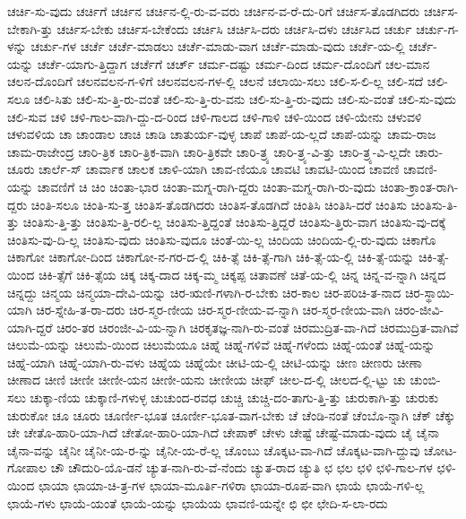 {ಚರ್ಚಿ-ಸು-ವುದು
ಚರ್ಚಿಗೆ
ಚರ್ಚಿನ
ಚರ್ಚಿನ-ಲ್ಲಿ-ರು-ವ-ವರು
ಚರ್ಚಿನ-ವ-ರೆ-ದು-ರಿಗೆ
ಚರ್ಚಿಸ-ತೊಡಗಿದರು
ಚರ್ಚಿಸ-ಬೇಕಾಗಿ-ತ್ತು
ಚರ್ಚಿಸ-ಬೇಕು
ಚರ್ಚಿಸ-ಬೇಕೆಂದು
ಚರ್ಚಿಸಿ
ಚರ್ಚಿಸಿ-ದರು
ಚರ್ಚಿಸಿ-ದಳು
ಚರ್ಚಿಸಿದ
ಚರ್ಚು
ಚರ್ಚು-ಗ-ಳನ್ನು
ಚರ್ಚು-ಗಳ
ಚರ್ಚೆ
ಚರ್ಚೆ-ಮಾಡಲು
ಚರ್ಚೆ-ಮಾಡು-ವಾಗ
ಚರ್ಚೆ-ಮಾಡು-ವುದು
ಚರ್ಚೆ-ಯ-ಲ್ಲಿ
ಚರ್ಚೆ-ಯನ್ನು
ಚರ್ಚೆ-ಯಾಗು-ತ್ತಿದ್ದಾಗ
ಚರ್ಚೆಗೆ
ಚರ್ಚ್
ಚರ್ಮ-ದಷ್ಟು
ಚರ್ಮ-ದಿಂದ
ಚರ್ಮ-ದೊಂದಿಗೆ
ಚಲ-ಮಾನ
ಚಲನ-ದೊಂದಿಗೆ
ಚಲನವಲನ-ಗ-ಳಿಗೆ
ಚಲನವಲನ-ಗಳ-ಲ್ಲಿ
ಚಲನೆ
ಚಲಾಯಿ-ಸಲು
ಚಲಿ-ಸ-ಲಿ-ಲ್ಲ
ಚಲಿ-ಸದೆ
ಚಲಿ-ಸಲೂ
ಚಲಿ-ಸಿತು
ಚಲಿ-ಸು-ತ್ತಿ-ರು-ವಂತೆ
ಚಲಿ-ಸು-ತ್ತಿ-ರು-ವನು
ಚಲಿ-ಸು-ತ್ತಿ-ರು-ವುದು
ಚಲಿ-ಸು-ವಂತೆ
ಚಲಿ-ಸು-ವುದು
ಚಲಿ-ಸುವ
ಚಳಿ
ಚಳಿ-ಗಾಲ-ವಾಗಿ-ದ್ದು-ದ-ರಿಂದ
ಚಳಿ-ಗಾಲದ
ಚಳಿ-ಗಾಳಿ
ಚಳಿ-ಯಿಂದ
ಚಳಿ-ಯೇನು
ಚಳುವಳಿ
ಚಳುವಳಿಯ
ಚಾ
ಚಾಂಡಾಲ
ಚಾಚಿ
ಚಾಡಿ
ಚಾತುರ್ಯ-ವುಳ್ಳ
ಚಾಪೆ
ಚಾಪೆ-ಯ-ಲ್ಲದೆ
ಚಾಪೆ-ಯನ್ನು
ಚಾಮ-ರಾಜ
ಚಾಮ-ರಾಜೇಂದ್ರ
ಚಾರಿ-ತ್ರಿಕ
ಚಾರಿ-ತ್ರಿಕ-ವಾಗಿ
ಚಾರಿ-ತ್ರಿಕವೇ
ಚಾರಿ-ತ್ರ್ಯ
ಚಾರಿ-ತ್ರ್ಯ-ವಿ-ತ್ತು
ಚಾರಿ-ತ್ರ್ಯ-ವಿ-ಲ್ಲದೇ
ಚಾರು-ಚೂರು
ಚಾರ್ಲೆ-ಸ್
ಚಾರ್ವಾಕ
ಚಾಲಕ
ಚಾಳಿ-ಯಾಗಿ
ಚಾವ-ಣಿಯೂ
ಚಾವಟಿ
ಚಾವಟಿ-ಯಿಂದ
ಚಾವಣಿ
ಚಾವಣಿ-ಯನ್ನು
ಚಾವಣಿಗೆ
ಚಿ
ಚಿಂ
ಚಿಂತಾ-ಭಾರ
ಚಿಂತಾ-ಮಗ್ನ-ರಾಗಿ-ದ್ದರು
ಚಿಂತಾ-ಮಗ್ನ-ರಾಗಿ-ರು-ವುದು
ಚಿಂತಾ-ಕ್ರಾಂತ-ರಾಗಿ-ದ್ದರು
ಚಿಂತಿ-ಸಲೂ
ಚಿಂತಿ-ಸು-ತ್ತ
ಚಿಂತಿಸ-ತೊಡಗಿದರು
ಚಿಂತಿಸ-ತೊಡಗಿದೆ
ಚಿಂತಿಸಿ
ಚಿಂತಿಸಿ-ದರೆ
ಚಿಂತಿಸು
ಚಿಂತಿಸು-ತಿ-ತ್ತು
ಚಿಂತಿಸು-ತ್ತಿ-ತ್ತು
ಚಿಂತಿಸು-ತ್ತಿ-ರಲಿ-ಲ್ಲ
ಚಿಂತಿಸು-ತ್ತಿದ್ದಂತೆ
ಚಿಂತಿಸು-ತ್ತಿದ್ದರೆ
ಚಿಂತಿಸು-ತ್ತಿರು-ವಾಗ
ಚಿಂತಿಸು-ವು-ದಕ್ಕೆ
ಚಿಂತಿಸು-ವು-ದಿ-ಲ್ಲ
ಚಿಂತಿಸು-ವುದು
ಚಿಂತಿಸು-ವುದೂ
ಚಿಂತೆ-ಯಿ-ಲ್ಲ
ಚಿಂದಿಯ
ಚಿಂದಿಯ-ಲ್ಲಿ-ರು-ವುದು
ಚಿಕಾಗೊ
ಚಿಕಾಗೋ
ಚಿಕಾಗೋ-ದಿಂದ
ಚಿಕಾಗೋ-ನ-ಗರ-ದ-ಲ್ಲಿ
ಚಿಕಿ-ತ್ಸೆ
ಚಿಕಿ-ತ್ಸೆ-ಗಾಗಿ
ಚಿಕಿ-ತ್ಸೆ-ಯ-ಲ್ಲಿ
ಚಿಕಿ-ತ್ಸೆ-ಯನ್ನು
ಚಿಕಿ-ತ್ಸೆ-ಯಿಂದ
ಚಿಕಿ-ತ್ಸೆಗೆ
ಚಿಕಿ-ತ್ಸೆಯ
ಚಿಕ್ಕ
ಚಿಕ್ಕ-ದಾದ
ಚಿಕ್ಕ-ಮ್ಮ
ಚಿಕ್ಕಪ್ಪ
ಚಿತಾವಣೆ
ಚಿತೆ-ಯ-ಲ್ಲಿ
ಚಿನ್ನ
ಚಿನ್ನ-ವ-ನ್ನಾಗಿ
ಚಿನ್ನದ
ಚಿನ್ನದ್ದು
ಚಿನ್ಮಯ
ಚಿನ್ಮಯಾ-ದೇವಿ-ಯನ್ನು
ಚಿರ-ಋಣಿ-ಗಳಾಗಿ-ರ-ಬೇಕು
ಚಿರ-ಕಾಲ
ಚಿರ-ಪರಿಚಿ-ತ-ನಾದ
ಚಿರ-ಸ್ಥಾಯಿ-ಯಾಗಿ
ಚಿರ-ಸ್ನೇಹಿ-ತ-ರಾ-ದರು
ಚಿರ-ಸ್ಮರ-ಣೀಯ
ಚಿರ-ಸ್ಮರ-ಣೀಯ-ವ-ನ್ನಾಗಿ
ಚಿರ-ಸ್ಮರ-ಣೀಯ-ವಾಗಿ
ಚಿರಂ-ಜೀವಿ-ಯಾಗಿ-ದ್ದರೆ
ಚಿರಂ-ತರ
ಚಿರಂಜೀ-ವಿ-ಯ-ನ್ನಾಗಿ
ಚಿರಕೃತಜ್ಞ-ನಾಗಿ-ರು-ವಂತೆ
ಚಿರಮುದ್ರಿತ-ವಾ-ಗಿದೆ
ಚಿರಮುದ್ರಿತ-ವಾಗಿವೆ
ಚಿಲುಮೆ-ಯನ್ನು
ಚಿಲುಮೆ-ಯಿಂದ
ಚಿಲುಮೆಯೂ
ಚಿಹ್ನೆ
ಚಿಹ್ನೆ-ಗಳಿವೆ
ಚಿಹ್ನೆ-ಗಳೆಂದು
ಚಿಹ್ನೆ-ಯಂತೆ
ಚಿಹ್ನೆ-ಯನ್ನು
ಚಿಹ್ನೆ-ಯಾಗಿ
ಚಿಹ್ನೆ-ಯಾಗಿ-ರು-ವಳು
ಚಿಹ್ನೆಯ
ಚಿಹ್ನೆಯೇ
ಚೀಟಿ-ಯ-ಲ್ಲಿ
ಚೀಟಿ-ಯನ್ನು
ಚೀಣ
ಚೀಣರು
ಚೀಣಾ
ಚೀಣಾದ
ಚೀಣಿ
ಚೀಣೀ
ಚೀಣೀ-ಯನ
ಚೀಣೀ-ಯನು
ಚೀಣೀಯ
ಚೀಫ್
ಚೀಲ-ದ-ಲ್ಲಿ
ಚೀಲದ-ಲ್ಲಿ-ಟ್ಟು
ಚು
ಚುಂಬಿ-ಸಲು
ಚುಕ್ಕಾ-ಣಿಯ
ಚುಕ್ಕಾಣಿ-ಗಳುಳ್ಳ
ಚುಚುಂದ-ರವಧ
ಚುಚ್ಚಿ
ಚುಚ್ಚಿ-ದಂ-ತಾಗು-ತ್ತಿ-ತ್ತು
ಚುರುಕಾಗಿ-ತ್ತು
ಚುರುಕು
ಚುರುಕೋ
ಚೂ
ಚೂರು
ಚೂರ್ಣೀ-ಭೂತ
ಚೂರ್ಣೀ-ಭೂತ-ವಾಗ-ಬೇಕು
ಚೆ
ಚೆಂಡಿ-ನಂತೆ
ಚೆಂಬೊ-ನ್ನಾಗಿ
ಚೆಕ್
ಚೆಕ್ಕು
ಚೇ
ಚೇತೊ-ಹಾರಿ-ಯಾ-ಗಿದೆ
ಚೇತೋ-ಹಾರಿ-ಯಾ-ಗಿದೆ
ಚೇಪಾಕ್
ಚೇಳು
ಚೇಷ್ಟೆ
ಚೇಷ್ಟೆ-ಮಾಡು-ವುದು
ಚೈ
ಚೈನಾ
ಚೈನಾ-ವನ್ನು
ಚೈನೀ
ಚೈನೀ-ಯ-ರ-ನ್ನು
ಚೈನೀ-ಯ-ರೆ-ಲ್ಲ
ಚೊಂಬು
ಚೊಕ್ಕಟ-ವಾ-ಗಿದೆ
ಚೊಕ್ಕಟ-ವಾಗಿ-ದ್ದುವು
ಚೋಟ-ಗೋಪಾಲ
ಚೌ
ಚೌದುರಿ-ಯೊ-ಡನೆ
ಚ್ಯುತ-ನಾಗಿ-ರು-ವೆ-ನೆಂದು
ಚ್ಯುತ-ರಾದ
ಚ್ಯುತಿ
ಛ
ಛಲ
ಛಳಿ
ಛಳಿ-ಗಾಲ-ಗಳ
ಛಳಿ-ಯಿಂದ
ಛಾಯಾ
ಛಾಯಾ-ಚಿ-ತ್ರ-ಗಳ
ಛಾಯಾ-ಮೂರ್ತಿ-ಗಳಿರಾ
ಛಾಯಾ-ರೂಪ-ವಾಗಿ
ಛಾಯೆ
ಛಾಯೆ-ಗಳಿ-ಲ್ಲ
ಛಾಯೆ-ಗಳು
ಛಾಯೆ-ಯಂತೆ
ಛಾಯೆ-ಯನ್ನು
ಛಾಯೆಯ
ಛಾವಣಿ-ಯನ್ನೇ
ಛಿ
ಛೀ
ಛೇದಿ-ಸ-ಲಾ-ರದು
}
